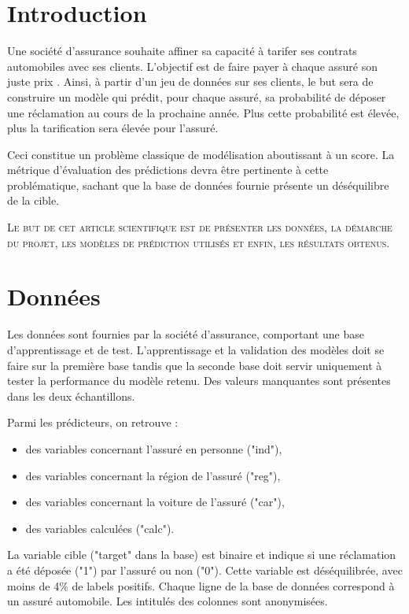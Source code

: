 \documentclass[french]{article}
\begin{document}
\begin{multicols}{2}
\section{Introduction}


Une société d'assurance souhaite affiner sa capacité à tarifer ses contrats automobiles avec ses clients. L'objectif est de faire payer à chaque assuré son \og juste prix \fg{}. Ainsi, à partir d'un jeu de données sur ses clients, le but sera de construire un modèle qui prédit, pour chaque assuré, sa probabilité de déposer une réclamation au cours de la prochaine année. Plus cette probabilité est élevée, plus la tarification sera élevée pour l'assuré.


Ceci constitue un problème classique de modélisation aboutissant à un score. La métrique d'évaluation des prédictions devra être pertinente à cette problématique, sachant que la base de données fournie présente un déséquilibre de la cible.

\textsc{Le but de cet article scientifique est de présenter les données, la démarche du projet, les modèles de prédiction utilisés et enfin, les résultats obtenus.} %

\section{Données}

Les données sont fournies par la société d'assurance, comportant une base d'apprentissage et de test. L'apprentissage et la validation des modèles doit se faire sur la première base tandis que la seconde base doit servir uniquement à tester la performance du modèle retenu. Des valeurs manquantes sont présentes dans les deux échantillons.

Parmi les prédicteurs, on retrouve :
\begin{itemize}
    \item des variables concernant l'assuré en personne ("ind"),
    \item des variables concernant la région de l'assuré ("reg"),
    \item des variables concernant la voiture de l'assuré ("car"),
    \item des variables calculées ("calc").
\end{itemize}

La variable cible ("target" dans la base) est binaire et indique si une réclamation a été déposée ("1") par l'assuré ou non ("0"). Cette variable est déséquilibrée, avec moins de 4\% de labels positifs. Chaque ligne de la base de données correspond à un assuré automobile. Les intitulés des colonnes sont anonymisées.




\end{multicols}
\end{document}
